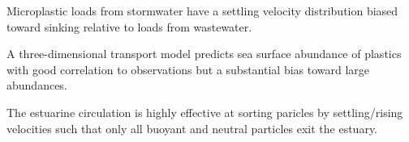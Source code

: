 \documentclass[draft]{jgr/agujournal2019}
\begin{document}



\begin{keypoints}
\item Microplastic loads from stormwater have a settling velocity distribution biased toward
  sinking relative to loads from wastewater.
\item A three-dimensional transport model predicts
  sea surface abundance of plastics with good correlation to observations but a substantial bias toward
  large abundances.
\item The estuarine circulation is highly effective at sorting paricles by settling/rising velocities such
  that only all buoyant and neutral particles exit the estuary.
\end{keypoints}

%
%

%
%

\end{document}
